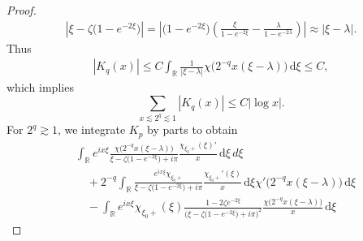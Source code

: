 \documentclass[../dissertation.tex]{subfiles}
\begin{document}
\begin{proof}
\begin{align*}
		\left| \xi - \zeta\big(1-e^{-2\xi}\big) \right|
			= 
				\left| 
					\big(1-e^{-2\xi}\big) 
					\left( 
						\frac{\xi}{1-e^{-2\xi}} - \frac{\lambda}{1-e^{-2\lambda}}
					\right)  
				\right|
			\approx \big|\xi-\lambda\big|.
	\end{align*}
	Thus 
	\begin{align*}
		|K_q(x)| 
			\leq C\int_{\mathbb R}
					\frac{1}{|\xi - \lambda|}
					\chi\big(2^{-q} x(\xi - \lambda)\big)
				\, \mathrm{d}\xi
			\leq C,
	\end{align*}
	which implies 
	\[
		\sum_{x \lesssim 2^q \lesssim 1} |K_q(x)| \leq C |\log x|.
	\]
	For $2^q \gtrsim 1$, we integrate $K_p$ by parts to obtain
	\begin{align}
		&\int_{\mathbb R} 
			e^{ix\xi}
			\frac{\chi\big(2^{-q} x( \xi - \lambda) \big)}
				{\xi-\zeta\big(1-e^{-2\xi}\big)+i \pi}
			\frac{\chi_{\xi_0+}(\xi)'}{x} \, \mathrm{d}\xi
		\,d\xi \label{eq: Gp part 1}\\
		&\quad + 2^{-q}
			\int_{\mathbb R} 
				\frac{e^{ix\xi}\chi_{\xi_0+}}
					{\xi-\zeta\big(1-e^{-2\xi}\big)+i \pi}
				\frac{\chi_{\xi_0+}'(\xi)}{x} \, \mathrm{d}\xi 
				\chi'\big( 2^{-q} x(\xi - \lambda) \big)
			\, \mathrm{d}\xi \label{eq: Gp part 2} \\
		&\quad - \int_{\mathbb R}
				e^{ix\xi} \chi_{\xi_0+}(\xi)
				\frac{1-2\zeta e^{-2\xi}}
					{\big(\xi-\zeta\big(1-e^{-2\xi}\big)+i\pi\big)^2}
				\frac{\chi\big(2^{-q} x(\xi - \lambda))} {x}
			\, \mathrm{d}\xi \label{eq: Gp part 3}
	\end{align}


\end{proof}
\end{document}
